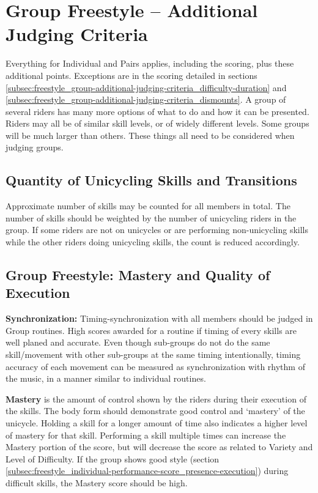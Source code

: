 \section{Group Freestyle -- Additional Judging Criteria}
Everything for Individual and Pairs applies, including the scoring, plus these additional points.
Exceptions are in the scoring detailed in sections \ref{subsec:freestyle_group-additional-judging-criteria_difficulty-duration} and \ref{subsec:freestyle_group-additional-judging-criteria_dismounts}.
A group of several riders has many more options of what to do and how it can be presented.
Riders may all be of similar skill levels, or of widely different levels.
Some groups will be much larger than others.
These things all need to be considered when judging groups.

\subsection{Quantity of Unicycling Skills and Transitions}
Approximate number of skills may be counted for all members in total.
The number of skills should be weighted by the number of unicycling riders in the group.
If some riders are not on unicycles or are performing non-unicycling skills while the other riders doing unicycling skills, the count is reduced accordingly.

\subsection{Group Freestyle: Mastery and Quality of Execution}
\textbf{Synchronization:} Timing-synchronization with all members should be judged in Group routines.
High scores awarded for a routine if timing of every skills are well planed and accurate.
Even though sub-groups do not do the same skill/movement with other sub-groups at the same timing intentionally, timing accuracy of each movement can be measured as synchronization with rhythm of the music, in a manner similar to individual routines.

\textbf{Mastery} is the amount of control shown by the riders during their execution of the skills.
The body form should demonstrate good control and `mastery' of the unicycle.
Holding a skill for a longer amount of time also indicates a higher level of mastery for that skill.
Performing a skill multiple times can increase the Mastery portion of the score, but will decrease the score as related to Variety and Level of Difficulty.
If the group shows good style (section \ref{subsec:freestyle_individual-performance-score_presence-execution}) during difficult skills, the Mastery score should be high.

